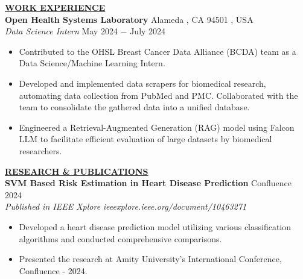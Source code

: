 \documentclass{article}
\begin{document}
% 
%
\noindent \textbf{\underline{WORK EXPERIENCE}} \\
\noindent \textbf{Open Health Systems Laboratory} \hfill Alameda , CA 94501 , USA \\
\textit{Data Science Intern} \hfill May 2024 $-$ July 2024
\begin{itemize}[noitemsep,nolistsep,leftmargin=*]
\item {Contributed to the OHSL Breast Cancer Data Alliance (BCDA) team as a Data Science/Machine Learning Intern.}
\item {Developed and implemented data scrapers for biomedical research, automating data collection from PubMed and PMC. Collaborated with the team to consolidate the gathered data into a unified database.}
\item { Engineered a Retrieval-Augmented Generation (RAG) model using Falcon LLM to facilitate efficient evaluation of large datasets by biomedical researchers.\\}
\end{itemize}

\noindent \textbf{\underline{RESEARCH \& PUBLICATIONS}} \\
\noindent \textbf{SVM Based Risk Estimation in Heart Disease Prediction} 
\hfill Confluence 2024 \\
\textit{Published in IEEE Xplore} 
\hfill \textit{ieeexplore.ieee.org/document/10463271}
\begin{itemize}[noitemsep,nolistsep,leftmargin=*]
\item {Developed a heart disease prediction model utilizing various classification algorithms and conducted comprehensive comparisons.}
\item {Presented the research at Amity University's International Conference, Confluence - 2024.\\}
\end{itemize}
\end{document}

